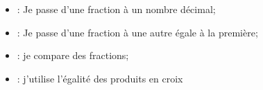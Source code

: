%		
%
%			

\vspace*{-0.3cm}

\begin{mycomp}
	\begin{itemize}
		\item {} : Je passe d'une fraction à un nombre décimal;
		\item {} :  Je passe d'une fraction à une autre égale à la première;
		\item {} :  je compare des fractions;	
		\item {} :  j'utilise l'égalité des produits en croix		
	\end{itemize}
\end{mycomp}


